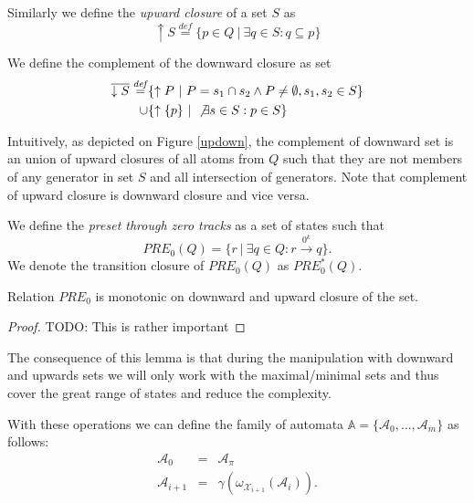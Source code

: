 \begin{defz}
 Similarly we define the \emph{upward closure} of a set $S$ as
 \begin{equation}
 \uparrow S \overset{\mathit{def}}{=} \{p\in Q\ |\ \exists q \in S: q \subseteq
 p\}
 \end{equation}
\end{defz}

\begin{defz}
We define the complement of the downward closure as set
 \begin{eqnarray}
 \overline{\downarrow S} \overset{\mathit{def}}{=} & \{ \uparrow P\ |\ P = s_1
 \cap s_2 \wedge P \neq \emptyset, s_1, s_2 \in S\}\\
 \cup & \{\uparrow\{p\}\ |\ \not\exists s \in S: p \in S\} 
 \end{eqnarray}
\end{defz}

Intuitively, as depicted on Figure \ref{updown}, the complement of downward set
is an union of upward closures of all atoms from $Q$ such that they are not
members of any generator in set $S$ and all intersection of generators. Note
that complement of upward closure is downward closure and vice versa. 

\begin{defz}
 We define the \emph{preset through zero tracks} as a set of states such that
 \begin{equation}
 PRE_0(Q) = \{r\ |\ \exists q \in Q: r \overset{0^k}{\longrightarrow} q\}.
 \end{equation}
 We denote the transition closure of $PRE_0(Q)$ as $PRE_0^*(Q)$.
\end{defz}

\begin{lemma}
Relation $PRE_0$ is monotonic on downward and upward closure of the set.
\end{lemma}\label{PRE-is-monotonic}
\begin{proof}
 {\color{red}TODO: This is rather important}
\end{proof}

The consequence of this lemma is that during the manipulation with downward and
upwards sets we will only work with the maximal/minimal sets and thus cover the
great range of states and reduce the complexity.

With these operations we can define the family of automata $\mathbb{A} =
\{\mathcal{A}_0,\ldots,\mathcal{A}_m\}$ as follows:
 \begin{eqnarray}
  \mathcal{A}_0 & = & \mathcal{A}_\pi\\
  \mathcal{A}_{i+1} & = & \gamma(\omega_{\mathcal{X}_{i+1}}(\mathcal{A}_i)).
 \end{eqnarray}
 
